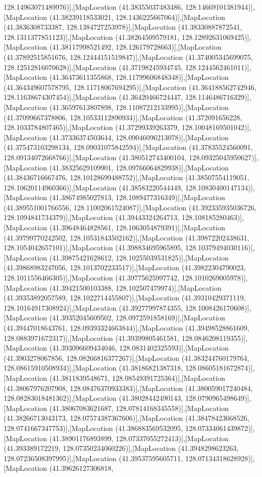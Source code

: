 128.14963071489976)],[MapLocation (41.38355037483486, 128.14669101381944)],[MapLocation (41.38239118533021, 128.1436225667064)],[MapLocation (41.3836308733387, 128.1384727253978)],[MapLocation (41.38330887872541, 128.1311377851123)],[MapLocation (41.38264509579181, 128.12892631069425)],[MapLocation (41.38117998521492, 128.126179728663)],[MapLocation (41.37892515851676, 128.12444151519847)],[MapLocation (41.374005345699075, 128.12512816070628)],[MapLocation (41.37198245934745, 128.1244562461011)],[MapLocation (41.36473611355868, 128.11799606848348)],[MapLocation (41.364349607578795, 128.11718067694295)],[MapLocation (41.364188562742946, 128.11638674307454)],[MapLocation (41.36420466724447, 128.1146486716329)],[MapLocation (41.36597613807898, 128.11087212133995)],[MapLocation (41.37099667378806, 128.10533112890934)],[MapLocation (41.372091656228, 128.1033784807465)],[MapLocation (41.37299339263379, 128.10048169501042)],[MapLocation (41.37336374503644, 128.09046096213078)],[MapLocation (41.375473103298134, 128.09031075842594)],[MapLocation (41.37835524560091, 128.09134072668766)],[MapLocation (41.380512743400104, 128.09325045950627)],[MapLocation (41.38325629109901, 128.09766064829938)],[MapLocation (41.38436716667476, 128.10128699488752)],[MapLocation (41.38507554119051, 128.10620114960366)],[MapLocation (41.38583220544449, 128.10830400147134)],[MapLocation (41.38674985027813, 128.1089477316349)],[MapLocation (41.389551001766556, 128.11002061524087)],[MapLocation (41.392335935036726, 128.1094841734379)],[MapLocation (41.39443324264713, 128.108185280463)],[MapLocation (41.39648464828561, 128.1063054879391)],[MapLocation (41.39799770242502, 128.10531843502162)],[MapLocation (41.39872202438631, 128.1054042657101)],[MapLocation (41.398834695965895, 128.10379494030116)],[MapLocation (41.39875421628612, 128.10255039531825)],[MapLocation (41.39868983247056, 128.1013702233517)],[MapLocation (41.39822304790023, 128.1011556466305)],[MapLocation (41.39775625997742, 128.1010269005978)],[MapLocation (41.39421500103388, 128.102507479974)],[MapLocation (41.39353892057589, 128.1022714455807)],[MapLocation (41.39310429371119, 128.10164917308924)],[MapLocation (41.39277997874355, 128.1008426170608)],[MapLocation (41.39352045609502, 128.0972591858169)],[MapLocation (41.39447018643761, 128.09393324663844)],[MapLocation (41.39498528861609, 128.0883971672317)],[MapLocation (41.39399805461581, 128.0846208119355)],[MapLocation (41.393096609434046, 128.0831402325593)],[MapLocation (41.3903278067856, 128.08266816377267)],[MapLocation (41.383244760179764, 128.08615910508934)],[MapLocation (41.38186821387318, 128.08605181672874)],[MapLocation (41.3811839548671, 128.08549391725364)],[MapLocation (41.38067976207908, 128.08476370933383)],[MapLocation (41.380059017240484, 128.08283018481362)],[MapLocation (41.38028442490143, 128.0790965498649)],[MapLocation (41.38067083621687, 128.07814168345558)],[MapLocation (41.38266713043173, 128.07574387367606)],[MapLocation (41.38478423668526, 128.0741667347753)],[MapLocation (41.386883569532095, 128.07334061439872)],[MapLocation (41.38901176893899, 128.07337055272413)],[MapLocation (41.393389172219, 128.07350234060226)],[MapLocation (41.3948298623263, 128.07236508397995)],[MapLocation (41.39537595605711, 128.07134318628928)],[MapLocation (41.39626127306818, 